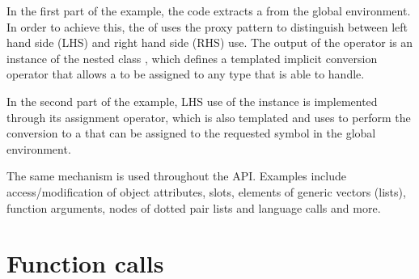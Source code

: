 In the first part of the example, the code extracts a 
 from the global environment. In order to achieve this, 
the   of  uses the proxy pattern 
\citep{meyers:moreeffectivecplusplus}
to distinguish between left hand side (LHS) and right hand side (RHS) use. 
%
The output of the operator is an instance of the nested class
, which defines a templated implicit conversion 
operator that allows a  to be assigned to any type that 
 is able to handle. 

In the second part of the example, LHS use of the  instance is 
implemented through its assignment operator, which is also templated and uses
 to perform the conversion to a  that can be 
assigned to the requested symbol in the global environment. 

The same mechanism is used throughout the API. Examples include access/modification
of object attributes, slots, elements of generic vectors (lists), 
function arguments, nodes of dotted pair lists and language calls and more. 

\section{Function calls}


